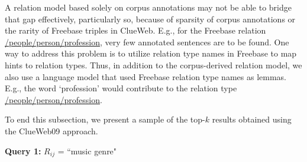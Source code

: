 \documentclass[a4paper, twoside, 12pt]{report}
\begin{document}
A relation model based solely on corpus annotations may not be able to bridge that gap effectively, particularly so, because of sparsity of corpus annotations or the rarity of Freebase triples in ClueWeb. E.g., for the Freebase relation \url{/people/person/profession}, very few annotated sentences are to be found.  One way
to address this problem is to utilize relation type
names in Freebase to map hints to relation types.
Thus, in addition to the corpus-derived relation
model, we also use a language model that used
Freebase relation type names as lemmas. E.g., the
word `profession' would contribute to the relation
type \url{/people/person/profession}.

To end this subsection, we present a sample of the top-$k$ results obtained using the ClueWeb09 approach.

\textbf{Query 1:} $R_{ij}$ = ``music genre"
\end{document}
